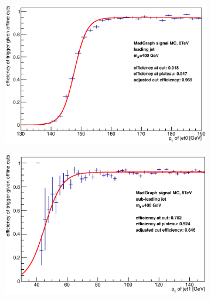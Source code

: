 \begin{figure}[phtb!]
  \begin{center}
  \begin{subfigure}[leading jet, $m_{A}=400$ GeV]{0.4\textwidth}\includegraphics[width=\textwidth]{Systematics/images/jet0_trigger_turn_on_bAbb_400_j35.eps}\end{subfigure}
  \begin{subfigure}[sub-leading jet, $m_{A}=400$ GeV]{0.4\textwidth}\includegraphics[width=\textwidth]{Systematics/images/jet1_trigger_turn_on_bAbb_400_j35.eps}\end{subfigure}

\end{center}
\end{figure}
